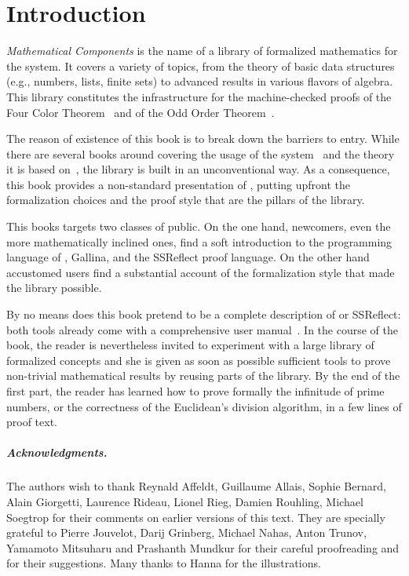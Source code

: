 \chapter*{Introduction}

\emph{Mathematical Components}
is the name of a library of formalized mathematics for the
\Coq{} system.  It covers a variety of
topics, from the theory of basic data structures (e.g., numbers, lists, finite
sets) to advanced results in various flavors of algebra. This library
constitutes the infrastructure for the machine-checked proofs of the
Four Color Theorem~\cite{Gonthier08} and of the
Odd Order Theorem~\cite{gonthier:hal-00816699}.

The reason of existence of this book is to break down the barriers to entry.
While there are several books around covering the usage of the
\Coq{} system~\cite{BC04,SF,CPDT}
and the theory it is based
on~\cite[chapter 4]{Coq:manual}\cite{paulinmohring:hal-01094195,hottbook},
the \mcbMC{} library is built
in an unconventional way.  As a consequence, this book provides a
non-standard presentation of \Coq{}, putting upfront the formalization
choices and the proof style that are the pillars of the library.

This books targets two classes of public.  On the one hand, newcomers,
even the more mathematically inclined ones, %
find a soft
introduction to the programming
language of \Coq{}, Gallina, and the SSReflect proof language.
On the other hand accustomed \Coq{} users %
find a
substantial account of the formalization style that made the \mcbMC{}
library possible.


By no means does this book pretend to be a complete description of \Coq{} or
SSReflect: both tools already come with a comprehensive user
manual~\cite{Coq:manual,ssrman}.
In the course of the book, the reader is nevertheless invited to
experiment with  a large library of formalized concepts and she is
given as soon as possible sufficient tools to prove non-trivial
mathematical results by reusing parts of the library. By the end of
the first part, the reader has learned how to prove formally the
infinitude of prime numbers, or the correctness of the Euclidean's
division algorithm, in a few lines of proof text.

\paragraph{Acknowledgments.} The authors wish to thank
Reynald Affeldt, Guillaume Allais, Sophie Bernard, Alain Giorgetti,
Laurence Rideau, Lionel Rieg,
Damien Rouhling, Michael Soegtrop for their comments
on earlier versions of this text. They are specially grateful to
Pierre Jouvelot, Darij Grinberg, Michael Nahas, Anton Trunov,
Yamamoto Mitsuharu and Prashanth Mundkur for
their careful proofreading and for their suggestions. Many thanks to
Hanna for the illustrations.

